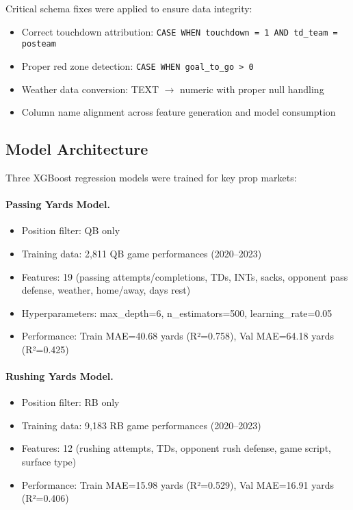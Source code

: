 Critical schema fixes were applied to ensure data integrity:
\begin{itemize}
  \item Correct touchdown attribution: \texttt{CASE WHEN touchdown = 1 AND td\_team = posteam}
  \item Proper red zone detection: \texttt{CASE WHEN goal\_to\_go > 0}
  \item Weather data conversion: TEXT $\to$ numeric with proper null handling
  \item Column name alignment across feature generation and model consumption
\end{itemize}

\subsection{Model Architecture}

Three XGBoost regression models were trained for key prop markets:

\paragraph{Passing Yards Model.}
\begin{itemize}
  \item Position filter: QB only
  \item Training data: 2,811 QB game performances (2020--2023)
  \item Features: 19 (passing attempts/completions, TDs, INTs, sacks, opponent pass defense, weather, home/away, days rest)
  \item Hyperparameters: max\_depth=6, n\_estimators=500, learning\_rate=0.05
  \item Performance: Train MAE=40.68 yards (R²=0.758), Val MAE=64.18 yards (R²=0.425)
\end{itemize}

\paragraph{Rushing Yards Model.}
\begin{itemize}
  \item Position filter: RB only
  \item Training data: 9,183 RB game performances (2020--2023)
  \item Features: 12 (rushing attempts, TDs, opponent rush defense, game script, surface type)
  \item Performance: Train MAE=15.98 yards (R²=0.529), Val MAE=16.91 yards (R²=0.406)
\end{itemize}

